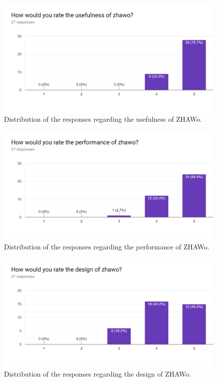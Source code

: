 \begin{markdown}
\begin{figure}[H]
  \includegraphics[width=13cm, center]{./figures/bar_1.png}
  \captionsetup{width=15.5cm}
  \caption [Usefulness Bar Diagram]{Distribution of the responses regarding the usefulness of ZHAWo.}
  \label{fig:BarUsefulness}
\end{figure}

\vspace{-5ex} %

\begin{figure}[H]
  \includegraphics[width=13cm, center]{./figures/bar_2.png}
  \captionsetup{width=15.5cm}
  \caption [Performance Bar Diagram]{Distribution of the responses regarding the performance of ZHAWo.}
  \label{fig:BarPerformance}
\end{figure}

\vspace{-5ex} %

\begin{figure}[H]
  \includegraphics[width=13cm, center]{./figures/bar_3.png}
  \captionsetup{width=15.5cm}
  \caption [Design Bar Diagram]{Distribution of the responses regarding the design of ZHAWo.}
  \label{fig:BarDesign}
\end{figure}

\end{markdown}